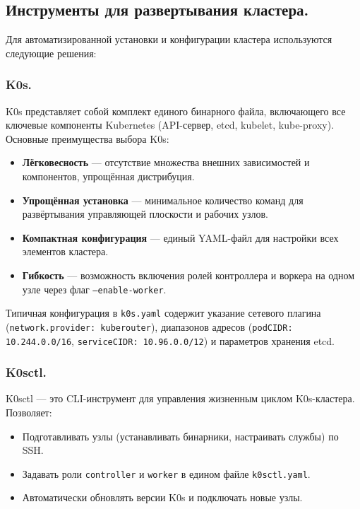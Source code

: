 \documentclass[14pt, a4paper]{extreport}
\begin{document}
\subsection{Инструменты для развертывания кластера.}

Для автоматизированной установки и конфигурации кластера используются следующие решения:

\subsubsection{K0s.}

K0s представляет собой комплект единого бинарного файла, включающего все ключевые компоненты Kubernetes (API-сервер, etcd, kubelet, kube-proxy). Основные преимущества выбора K0s:
\begin{itemize}
\item \textbf{Лёгковесность} — отсутствие множества внешних зависимостей и компонентов, упрощённая дистрибуция.
\item \textbf{Упрощённая установка} — минимальное количество команд для развёртывания управляющей плоскости и рабочих узлов.
\item \textbf{Компактная конфигурация} — единый YAML-файл для настройки всех элементов кластера.
\item \textbf{Гибкость} — возможность включения ролей контроллера и воркера на одном узле через флаг \texttt{--enable-worker}.
\end{itemize}

Типичная конфигурация в \texttt{k0s.yaml} содержит указание сетевого плагина (\texttt{network.provider: kuberouter}), диапазонов адресов (\texttt{podCIDR: 10.244.0.0/16}, \texttt{serviceCIDR: 10.96.0.0/12}) и параметров хранения etcd.

\subsubsection{K0sctl.}

K0sctl — это CLI-инструмент для управления жизненным циклом K0s-кластера. Позволяет:
\begin{itemize}
\item Подготавливать узлы (устанавливать бинарники, настраивать службы) по SSH.
\item Задавать роли \texttt{controller} и \texttt{worker} в едином файле \texttt{k0sctl.yaml}.
\item Автоматически обновлять версии K0s и подключать новые узлы.
\end{itemize}
\end{document}
